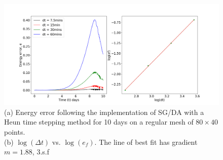 \begin{figure}[h]
	\includegraphics[width=1.1\linewidth]{evaluation/energy_10D_heun}
	\caption[Energy Error from implementation of SG/DA via Heun timestepping method for 10 days]{(a) Energy error following the implementation of SG/DA with a Heun time stepping method for 10 days on a regular mesh of $80 \times 40$ points.\\ 
		(b) $\log(\Delta t)$ vs. $\log(e_f)$. The line of best fit has gradient $m = 1.88$, 3.s.f}
	\label{fig:energy10dheun}
\end{figure}  
\pagebreak
